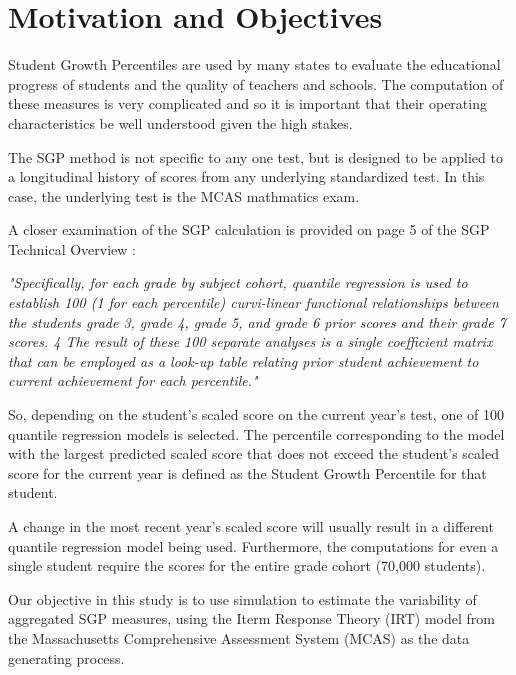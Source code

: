 \documentclass[reqno,12pt]{amsart}
\theoremstyle{plain}
\numberwithin{equation}{section} %
\numberwithin{figure}{section} %
\theoremstyle{remark}
\begin{document}
\section{Motivation and Objectives}
Student Growth Percentiles are used by many states to evaluate the educational progress of students and the quality of teachers and schools.  The computation of these measures is very complicated and so it is important that their operating characteristics be well understood given the high stakes.    
\par\vspace{0.3 cm}
The SGP method is not specific to any one test, but is designed to be applied to a longitudinal history of scores from any underlying standardized test.  In this case, the underlying test is the MCAS mathmatics exam. 
\par\vspace{0.3 cm}
A closer examination of the SGP calculation is provided on page 5 of the SGP Technical Overview \cite{bb3}:
\par\vspace{0.3 cm}
\textit{"Specifically, for each grade by subject cohort, quantile
regression is used to establish 100 (1 for each percentile) curvi-linear functional relationships between
the students grade 3, grade 4, grade 5, and grade 6 prior scores and their grade 7 scores. 4 The result
of these 100 separate analyses is a single coefficient matrix that can be employed as a look-up table
relating prior student achievement to current achievement for each percentile."}   
\par\vspace{0.3 cm}
So, depending on the student's scaled score on the current year's test, one of 100 quantile regression models is selected.  The percentile corresponding to the model with the largest predicted scaled score that does not exceed the student's scaled score for the current year is defined as the Student Growth Percentile for that student. 
\par\vspace{0.3 cm}
A change in the most recent year's scaled score will usually result in a different quantile regression model being used.  Furthermore, the computations for even a single student require the scores for the entire grade cohort (70,000 students).  
\par\vspace{0.3 cm}
Our objective in this study is to use simulation to estimate the variability of aggregated SGP measures, using the Iterm Response Theory (IRT) model from the Massachusetts Comprehensive Assessment System (MCAS) as the data generating process.
\par\vspace{0.3 cm}
\end{document}
